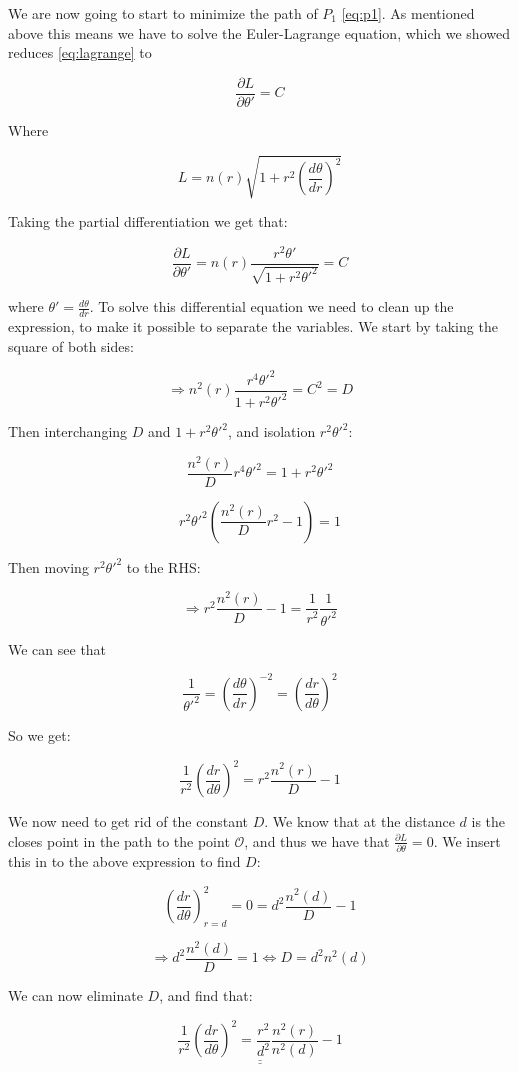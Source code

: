 \documentclass[a4paper,norsk, 10pt]{article}
\begin{document}
We are now going to start to minimize the path of $P_1$ \eqref{eq:p1}. As mentioned above this means we have to solve the Euler-Lagrange equation, which we showed reduces \eqref{eq:lagrange} to

$$
\frac{\partial L}{\partial \theta'} = C
$$

Where

$$
L = n(r)\sqrt{1 + r^2 \left(\frac{d\theta}{dr}\right)^2}
$$

Taking the partial differentiation we get that:

$$
\frac{\partial L}{\partial \theta'} = n(r) \frac{r^2\theta'}{\sqrt{1 + r^2\theta'^2}} = C
$$

where $\theta' = \frac{d\theta}{dr}$. To solve this differential equation we need to clean up the expression, to make it possible to separate the variables. We start by taking the square of both sides:

$$
\Rightarrow n^2(r)\frac{r^4 \theta'^2}{1+r^2\theta'^2} = C^2 = D
$$

Then interchanging $D$ and $1+r^2\theta'^2$, and isolation $r^2\theta'^2$:

$$
\frac{n^2(r)}{D}r^4\theta'^2 = 1 + r^2\theta'^2
$$

$$
r^2\theta'^2\left(\frac{n^2(r)}{D}r^2 - 1\right) = 1
$$

Then moving $r^2\theta'^2$ to the RHS:

$$
\Rightarrow r^2\frac{n^2(r)}{D} - 1 = \frac{1}{r^2}\frac{1}{\theta'^2}
$$

We can see that 

$$
\frac{1}{\theta'^2} = \left(\frac{d\theta}{dr}\right)^{-2} = \left(\frac{dr}{d\theta}\right)^2
$$

So we get:

$$
\frac{1}{r^2}\left(\frac{dr}{d\theta}\right)^2 = r^2\frac{n^2(r)}{D} -1
$$

We now need to get rid of the constant $D$. We know that at the distance $d$ is the closes point in the path to the point $\mathcal{O}$, and thus we have that $\frac{\partial L}{\partial \theta} = 0$. We insert this in to the above expression to find $D$:


$$
\left(\frac{dr}{d\theta}\right)^2_{r = d} = 0 = d^2\frac{n^2(d)}{D} -1
$$

$$
\Rightarrow d^2\frac{n^2(d)}{D} = 1 \Leftrightarrow D = d^2 n^2(d)
$$

We can now eliminate $D$, and find that:

\begin{equation}
\underline{\underline{\frac{1}{r^2}\left(\frac{dr}{d\theta}\right)^2 = \frac{r^2}{d^2}\frac{n^2(r)}{n^2(d)} -1}}
\label{eq:sepDiff}
\end{equation}
\end{document}

